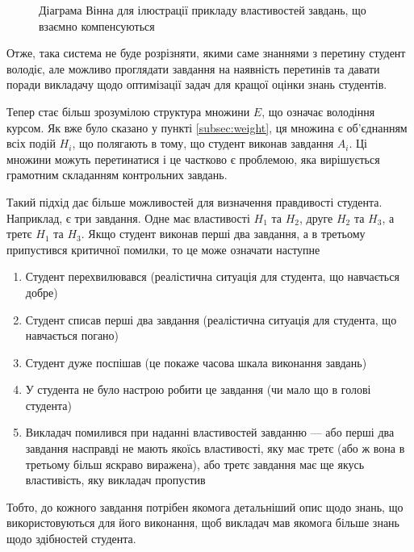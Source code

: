 \begin{figure}[h]
  \center
  \caption{Діаграма Вінна для ілюстрації прикладу властивостей завдань,
    що взаємно компенсуються}
  \label{fig:tikz:tasksPropertiesAdvancedVenn}
\end{figure}

Отже, така система не буде розрізняти, якими саме знаннями з перетину студент
володіє, але можливо проглядати завдання на наявність перетинів та давати
поради викладачу щодо оптимізації задач для кращої оцінки знань студентів.

Тепер стає більш зрозумілою структура множини $E$, що означає володіння курсом.
Як вже було сказано у пункті \ref{subsec:weight}, ця множина є об’єднанням всіх
подій $H_i$, що полягають в тому, що студент виконав завдання $A_i$.
Ці множини можуть перетинатися і це частково є проблемою, яка вирішується
грамотним складанням контрольних завдань.

Такий підхід дає більше можливостей для визначення правдивості студента.
Наприклад, є три завдання.
Одне має властивості $H_1$ та $H_2$, друге $H_2$ та $H_3$, а третє $H_1$ та
$H_3$.
Якщо студент виконав перші два завдання, а в третьому припустився критичної
помилки, то це може означати наступне
\begin{enumerate}
  \item
    Студент перехвилювався (реалістична ситуація для студента, що навчається
    добре)
  \item
    Студент списав перші два завдання (реалістична ситуація для студента, що
    навчається погано)
  \item
    Студент дуже поспішав (це покаже часова шкала виконання завдань)
  \item
    У студента не було настрою робити це завдання (чи мало що в голові студента)
  \item
    Викладач помилився при наданні властивостей завданню --- або перші два
    завдання насправді не мають якоїсь властивості, яку має третє (або ж вона
    в третьому більш яскраво виражена), або третє завдання має ще якусь
    властивість, яку викладач пропустив
\end{enumerate}

Тобто, до кожного завдання потрібен якомога детальніший опис щодо знань, що
використовуються для його виконання, щоб викладач мав якомога більше знань щодо
здібностей студента.
